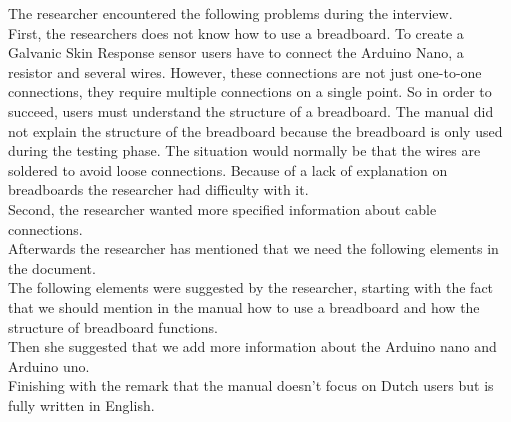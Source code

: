 \documentclass[conference]{IEEEtran}
\begin{document}
\begin{figure*}[ht]
\begin{enumerate}
\begin{enumerate}
\begin{figure*}[!ht]
\begin{enumerate}
\begin{enumerate}
						The researcher encountered the following problems during the interview.\\

						First, the researchers does not know how to use a breadboard. To create a Galvanic Skin Response sensor users have to connect the Arduino Nano, a resistor and several wires. However, these connections are not just one-to-one connections, they require multiple connections on a single point. So in order to succeed, users must understand the structure of a breadboard. The manual did not explain the structure of the breadboard because the breadboard is only used during the testing phase. The situation would normally be that the wires are soldered to avoid loose connections. Because of a lack of explanation on breadboards the researcher had difficulty with it.\\
						Second, the researcher wanted more specified information about cable connections.\\
						Afterwards the researcher has mentioned that we need the following elements in the document.\\
						The following elements were suggested by the researcher, starting with the fact that we should mention in the manual how to use a breadboard and how the structure of breadboard functions. \\
						Then she suggested that we add more information about the Arduino nano and Arduino uno.\\
						Finishing with the remark that the manual doesn't focus on Dutch users but is fully written in English.\\		
						

\end{enumerate}
\end{enumerate}
\end{figure*}
\end{enumerate}
\end{enumerate}
\end{figure*}
\end{document}
